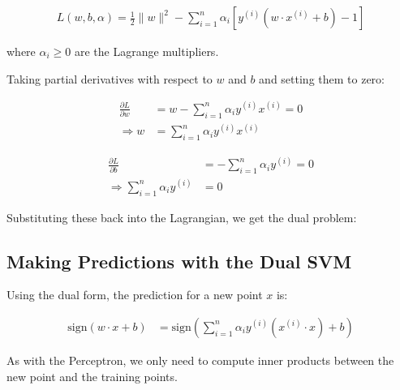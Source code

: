 \documentclass{article}
\begin{document}
\begin{align}
L(w, b, \alpha) = \frac{1}{2}\|w\|^2 - \sum_{i=1}^{n} \alpha_i [y^{(i)}(w \cdot x^{(i)} + b) - 1]
\end{align}

where $\alpha_i \geq 0$ are the Lagrange multipliers.

Taking partial derivatives with respect to $w$ and $b$ and setting them to zero:

\begin{align}
\frac{\partial L}{\partial w} &= w - \sum_{i=1}^{n} \alpha_i y^{(i)} x^{(i)} = 0 \\
\Rightarrow w &= \sum_{i=1}^{n} \alpha_i y^{(i)} x^{(i)}
\end{align}

\begin{align}
\frac{\partial L}{\partial b} &= -\sum_{i=1}^{n} \alpha_i y^{(i)} = 0 \\
\Rightarrow \sum_{i=1}^{n} \alpha_i y^{(i)} &= 0
\end{align}

Substituting these back into the Lagrangian, we get the dual problem:


\subsection{Making Predictions with the Dual SVM}
Using the dual form, the prediction for a new point $x$ is:

\begin{align}
\text{sign}(w \cdot x + b) &= \text{sign}\left(\sum_{i=1}^{n} \alpha_i y^{(i)} (x^{(i)} \cdot x) + b\right)
\end{align}

As with the Perceptron, we only need to compute inner products between the new point and the training points.
\end{document}
